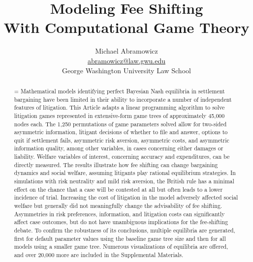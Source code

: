 \documentclass{article}
\newenvironment{nohyphen}
  {\tolerance=1%
   \emergencystretch=\maxdimen%
   \hyphenpenalty=10000%
   \hbadness=10000}%
  {\par}%
\begin{document}
\title{Modeling Fee Shifting \\ With Computational Game Theory}
\author{Michael Abramowicz \\ \href{mailto:abramowicz@law.gwu.edu}{abramowicz@law.gwu.edu} \\ George Washington University Law School}

\maketitle

\begin{abstract}
\begin{nohyphen}
Mathematical models identifying perfect Bayesian Nash equilibria in settlement bargaining have been limited in their ability to incorporate a number of independent features of litigation. This Article adapts a linear programming algorithm to solve litigation games represented in extensive-form game trees of approximately 45,000 nodes each. The 1,250 permutations of game parameters solved allow for two-sided asymmetric information, litigant decisions of whether to file and answer, options to quit if settlement fails, asymmetric risk aversion, asymmetric costs, and asymmetric information quality, among other variables, in cases concerning either damages or liability. Welfare variables of interest, concerning accuracy and expenditures, can be directly measured. The results illustrate how fee shifting can change bargaining dynamics and social welfare, assuming litigants play rational equilibrium strategies. In simulations with risk neutrality and mild risk aversion, the British rule has a minimal effect on the chance that a case will be contested at all but often leads to a lower incidence of trial. Increasing the cost of litigation in the model adversely affected social welfare but generally did not meaningfully change the advisability of fee shifting. Asymmetries in risk preferences, information, and litigation costs can significantly affect case outcomes, but do not have unambiguous implications for the fee-shifting debate. To confirm the robustness of its conclusions, multiple equilibria are generated, first for default parameter values using the baseline game tree size and then for all models using a smaller game tree. Numerous visualizations of equilibria are offered, and over 20,000 more are included in the Supplemental Materials. 
\end{nohyphen}
\end{abstract}
\end{document}
